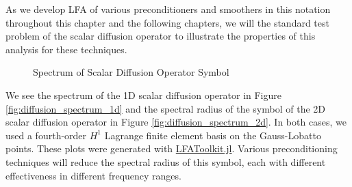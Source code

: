 As we develop LFA of various preconditioners and smoothers in this notation throughout this chapter and the following chapters, we will the standard test problem of the scalar diffusion operator to illustrate the properties of this analysis for these techniques.

\begin{figure}[!h]
  \centering
  \hfill
  \caption{Spectrum of Scalar Diffusion Operator Symbol}
\end{figure}

We see the spectrum of the 1D scalar diffusion operator in Figure \ref{fig:diffusion_spectrum_1d} and the spectral radius of the symbol of the 2D scalar diffusion operator in Figure \ref{fig:diffusion_spectrum_2d}.
In both cases, we used a fourth-order $H^1$ Lagrange finite element basis on the Gauss-Lobatto points.
These plots were generated with \href{https://www.github.com/jeremylt/LFAToolkit.jl}{LFAToolkit.jl}.
Various preconditioning techniques will reduce the spectral radius of this symbol, each with different effectiveness in different frequency ranges.

